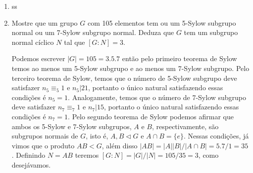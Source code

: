 \documentclass{article}
\begin{document}
\begin{enumerate}
		\item ss
		
		\item Mostre que um grupo $G$ com 105 elementos tem ou um 5-Sylow subgrupo normal ou um 7-Sylow subgrupo normal. Deduza que  $G$ tem um subgrupo normal cíclico $N$ tal que $[G:N] = 3$.
		
		Podemos escrever $|G| = 105 = 3.5.7$ então pelo primeiro teorema de Sylow temos ao menos um 5-Sylow subgrupo e ao menos um 7-Sylow subgrupo. Pelo terceiro teorema de Sylow, temos que o número de 5-Sylow subgrupo deve satisfazer $n_{5} \equiv_{5} 1$ e $n_{5} | 21$, portanto o único natural satisfazendo essas condições é $n_{5} = 1$. Analogamente, temos que o número de 7-Sylow subgrupo deve satisfazer $n_{7} \equiv_{7} 1$ e $n_{7} | 15$, portanto o único natural satisfazendo essas condições é $n_{7} = 1$. Pelo segundo teorema de Sylow podemos afirmar que ambos os 5-Sylow e 7-Sylow subgrupos, $A$ e $B$, respectivamente, são subgrupos normais de $G$, isto é, $A, B \vartriangleleft G$ e $A \cap B = \{e\}$. Nessas condições, já vimos que o produto $AB < G$, além disso $|AB| = |A||B|/|A\cap B| = 5.7/1 = 35$. Definindo $N = AB$ teremos $[G:N] = |G|/|N| = 105/35 = 3$, como desejávamos.
	\end{enumerate}
	
	
\end{document}
